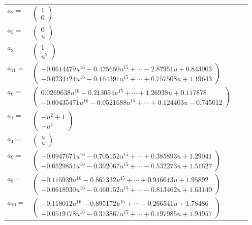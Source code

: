 \documentclass[1p]{elsarticle_modified}
\theoremstyle{definition}
\begin{document}
\begin{tabular}{m{7pt} m{180pt} m{7pt} m{180pt} }
\flushright $a_{2}=$&$\begin{pmatrix}1\\0\end{pmatrix}$ \\
\flushright $a_{5}=$&$\begin{pmatrix}0\\u\end{pmatrix}$ \\
\flushright $a_{3}=$&$\begin{pmatrix}1\\u^2\end{pmatrix}$ \\
\flushright $a_{11}=$&$\begin{pmatrix}-0.0614479 u^{16}-0.475650 u^{15}+\cdots-2.87951 u+0.843903\\-0.0234124 u^{16}-0.164391 u^{15}+\cdots+0.757508 u+1.19643\end{pmatrix}$ \\
\flushright $a_{6}=$&$\begin{pmatrix}0.0269638 u^{16}+0.213054 u^{15}+\cdots+1.26938 u+0.117878\\-0.00435471 u^{16}-0.0521688 u^{15}+\cdots+0.124403 u-0.745012\end{pmatrix}$ \\
\flushright $a_{1}=$&$\begin{pmatrix}- u^2+1\\- u^4\end{pmatrix}$ \\
\flushright $a_{4}=$&$\begin{pmatrix}u\\u\end{pmatrix}$ \\
\flushright $a_{9}=$&$\begin{pmatrix}-0.0947671 u^{16}-0.705152 u^{15}+\cdots+0.385893 u+1.29041\\-0.0529851 u^{16}-0.392067 u^{15}+\cdots-0.532273 u+1.51627\end{pmatrix}$ \\
\flushright $a_{8}=$&$\begin{pmatrix}-0.115939 u^{16}-0.867332 u^{15}+\cdots+0.946013 u+1.95892\\-0.0618930 u^{16}-0.460152 u^{15}+\cdots-0.813462 u+1.63140\end{pmatrix}$ \\
\flushright $a_{10}=$&$\begin{pmatrix}-0.118012 u^{16}-0.895172 u^{15}+\cdots-0.266541 u+1.78486\\-0.0519178 u^{16}-0.373867 u^{15}+\cdots+0.197985 u+1.94957\end{pmatrix}$ \\

\end{tabular}
\end{document}
